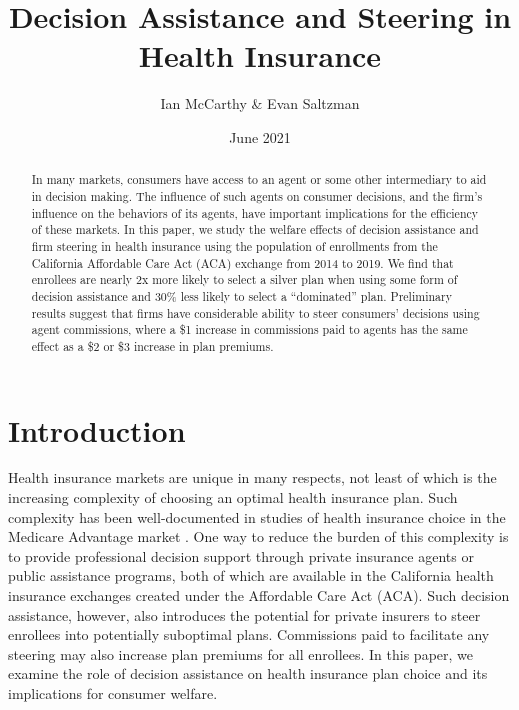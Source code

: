 \documentclass[12pt]{article}
\begin{document}
\title{Decision Assistance and Steering in Health Insurance}
\author{Ian McCarthy \& Evan Saltzman}
\date{June 2021}
\maketitle

\vspace{-2ex}
\begin{abstract}
\noindent In many markets, consumers have access to an agent or some other intermediary to aid in decision making. The influence of such agents on consumer decisions, and the firm's influence on the behaviors of its agents, have important implications for the efficiency of these markets. In this paper, we study the welfare effects of decision assistance and firm steering in health insurance using the population of enrollments from the California Affordable Care Act (ACA) exchange from 2014 to 2019. We find that enrollees are nearly 2x more likely to select a silver plan when using some form of decision assistance and 30\% less likely to select a ``dominated'' plan. Preliminary results suggest that firms have considerable ability to steer consumers' decisions using agent commissions, where a \$1 increase in commissions paid to agents has the same effect as a \$2 or \$3 increase in plan premiums.
\end{abstract}

\clearpage

\section{Introduction}
\label{sec:introduction}

Health insurance markets are unique in many respects, not least of which is the increasing complexity of choosing an optimal health insurance plan. Such complexity has been well-documented in studies of health insurance choice in the Medicare Advantage market \citep{abaluck2011, ketcham2012, gruber2017}. One way to reduce the burden of this complexity is to provide professional decision support through private insurance agents or public assistance programs, both of which are available in the California health insurance exchanges created under the Affordable Care Act (ACA). Such decision assistance, however, also introduces the potential for private insurers to steer enrollees into potentially suboptimal plans. Commissions paid to facilitate any steering may also increase plan premiums for all enrollees. In this paper, we examine the role of decision assistance on health insurance plan choice and its implications for consumer welfare.
\end{document}
